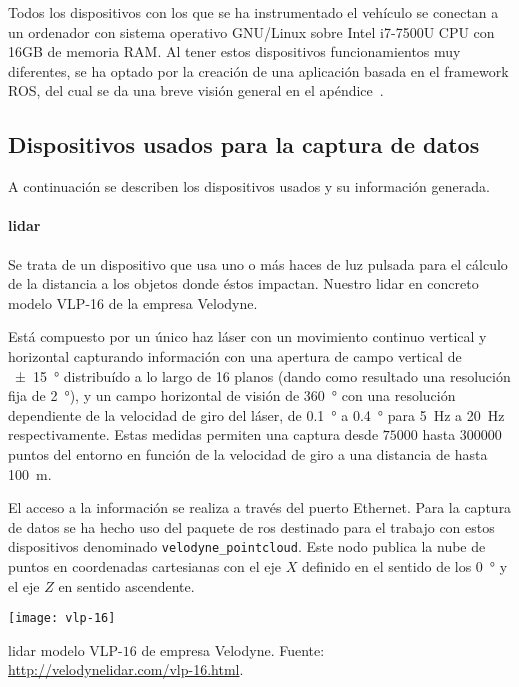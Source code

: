 Todos los dispositivos con los que se ha instrumentado el vehículo se conectan a un ordenador con sistema operativo GNU/Linux sobre Intel i7-7500U CPU con 16GB de memoria RAM. Al tener estos dispositivos funcionamientos muy diferentes, se ha optado por la creación de una aplicación basada en el framework ROS, del cual se da una breve visión general en el apéndice~.

\subsection{Dispositivos usados para la captura de datos}

A continuación se describen los dispositivos usados y su información generada.

\paragraph{\acrshort{lidar}}

Se trata de un dispositivo que usa uno o más haces de luz pulsada para el cálculo de la distancia a los objetos donde éstos impactan. Nuestro \acrshort{lidar} en concreto modelo VLP-16 de la empresa Velodyne.

Está compuesto por un único haz láser con un movimiento continuo vertical y horizontal capturando información con una apertura de campo vertical de \SI{\pm15}{\degree} distribuído a lo largo de 16 planos (dando como resultado una resolución fija de \SI{2}{\degree}), y un campo horizontal de visión de \SI{360}{\degree} con una resolución dependiente de la velocidad de giro del láser, de \SI{0.1}{\degree} a \SI{0.4}{\degree} para \SI{5}{\Hz} a \SI{20}{\Hz} respectivamente. Estas medidas permiten una captura desde $75000$ hasta $300000$ puntos del entorno en función de la velocidad de giro a una distancia de hasta \SI{100}{\meter}.

El acceso a la información se realiza a través del puerto Ethernet. Para la captura de datos se ha hecho uso del paquete de \ac{ros} destinado para el trabajo con estos dispositivos denominado \texttt{velodyne\_pointcloud}. Este nodo publica la nube de puntos en coordenadas cartesianas con el eje $X$ definido en el sentido de los \SI{0}{\degree} y el eje $Z$ en sentido ascendente.

\begin{marginfigure}
	\texttt{[image: vlp-16]}
	\caption[\acrshort{lidar} modelo VLP-$16$ de empresa Velodyne]{\acrshort{lidar} modelo VLP-$16$ de empresa Velodyne. Fuente: \url{http://velodynelidar.com/vlp-16.html}.}
	\label{fig:vlp-16}
\end{marginfigure}

